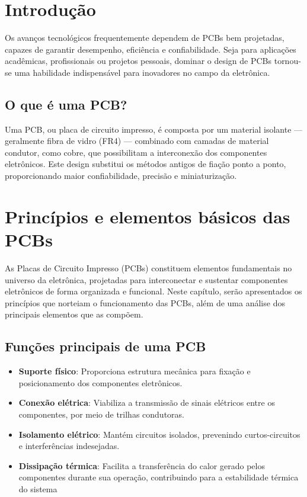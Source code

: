\hypertarget{introduuxe7uxe3o}{%
\chapter{Introdução}\label{introduuxe7uxe3o}}

Os avanços tecnológicos frequentemente dependem de PCBs bem projetadas, capazes de garantir desempenho, eficiência e confiabilidade. Seja para aplicações acadêmicas, profissionais ou projetos pessoais, dominar o design de PCBs tornou-se uma habilidade indispensável para inovadores no campo da eletrônica.

\hypertarget{o-que-uxe9-uma-pcb}{%
\section{O que é uma PCB?}\label{o-que-uxe9-uma-pcb}}

Uma PCB, ou placa de circuito impresso, é composta por um material isolante --- geralmente fibra de vidro (FR4) --- combinado com camadas de material condutor, como cobre, que possibilitam a interconexão dos componentes eletrônicos. Este design substitui os métodos antigos de fiação ponto a ponto, proporcionando maior confiabilidade, precisão e miniaturização.

\hypertarget{princuxedpios-e-elementos-buxe1sicos-das-pcbs}{%
\chapter{Princípios e elementos básicos das PCBs}\label{princuxedpios-e-elementos-buxe1sicos-das-pcbs}}

As Placas de Circuito Impresso (PCBs) constituem elementos fundamentais no universo da eletrônica, projetadas para interconectar e sustentar componentes eletrônicos de forma organizada e funcional. Neste capítulo, serão apresentados os princípios que norteiam o funcionamento das PCBs, além de uma análise dos principais elementos que as compõem.

\hypertarget{funuxe7uxf5es-principais-de-uma-pcb}{%
\section{Funções principais de uma PCB}\label{funuxe7uxf5es-principais-de-uma-pcb}}

\begin{itemize}
\tightlist
\item
  \textbf{Suporte físico}: Proporciona estrutura mecânica para fixação e posicionamento dos componentes eletrônicos.
\item
  \textbf{Conexão elétrica}: Viabiliza a transmissão de sinais elétricos entre os componentes, por meio de trilhas condutoras.
\item
  \textbf{Isolamento elétrico}: Mantém circuitos isolados, prevenindo curtos-circuitos e interferências indesejadas.
\item
  \textbf{Dissipação térmica}: Facilita a transferência do calor gerado pelos componentes durante sua operação, contribuindo para a estabilidade térmica do sistema
\end{itemize}

